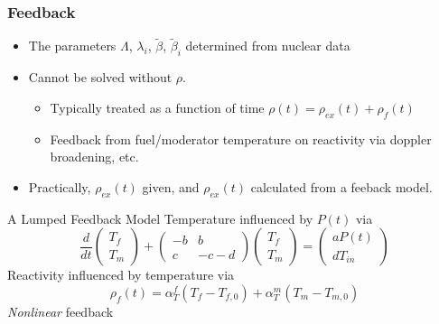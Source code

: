 \documentclass[10pt,compress]{beamer}
\begin{document}
\begin{frame}\frametitle{Feedback}
\begin{itemize}
    \item The parameters $\Lambda$, $\lambda_i$, $\tilde{\beta}$, $\tilde{\beta}_i$ determined from nuclear data
    \item Cannot be solved without $\rho$.
        \begin{itemize}
            \item Typically treated as a function of time $\rho(t)= \rho_{ex}(t) + \rho_{f}(t)$
            \item Feedback from fuel/moderator temperature on reactivity via doppler broadening, etc.
        \end{itemize}
    \item Practically, $\rho_{ex}(t)$ given, and $\rho_{ex}(t)$ calculated from a feeback model.
\end{itemize}
    \begin{block}{A Lumped Feedback Model}
        Temperature influenced by $P(t)$ via
        \begin{equation}
            \frac{d}{dt}\begin{pmatrix}
                T_f\\
                T_m
            \end{pmatrix}  + \begin{pmatrix}
                -b & b\\
                c & -c -d
            \end{pmatrix}\begin{pmatrix}
                T_f\\
                T_m
            \end{pmatrix} = \begin{pmatrix}
                a P(t)\\
                d T_{in}
            \end{pmatrix}\nonumber
        \end{equation}
        Reactivity influenced by temperature via
        \begin{equation}
            \rho_f(t) = \alpha_T^f (T_f - T_{f,0}) + \alpha_T^m (T_m - T_{m,0})\nonumber
        \end{equation}
        \emph{Nonlinear} feedback
    \end{block}
\end{frame}
\end{document}
